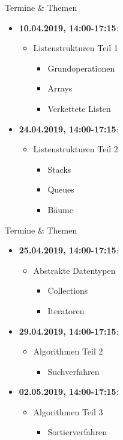\begin{frame}{Termine \& Themen}
	\begin{itemize}
		\item \textbf{10.04.2019, 14:00-17:15}:
		\begin{itemize}
			\item Listenstrukturen Teil 1
			\begin{itemize}
				\item Grundoperationen
				\item Arrays
				\item Verkettete Listen
			\end{itemize}
		\end{itemize}
		\item \textbf{24.04.2019, 14:00-17:15}:
		\begin{itemize}
			\item Listenstrukturen Teil 2
			\begin{itemize}
				\item Stacks
				\item Queues
				\item Bäume
			\end{itemize}
		\end{itemize}
	\end{itemize}
\end{frame}

\begin{frame}{Termine \& Themen}
	\begin{itemize}
		\item \textbf{25.04.2019, 14:00-17:15}:
		\begin{itemize}
			\item Abstrakte Datentypen
			\begin{itemize}
				\item Collections
				\item Iteratoren
			\end{itemize}
		\end{itemize}
		\item \textbf{29.04.2019, 14:00-17:15}:
		\begin{itemize}
			\item Algorithmen Teil 2
			\begin{itemize}
				\item Suchverfahren
			\end{itemize}
		\end{itemize}
		\item \textbf{02.05.2019, 14:00-17:15}:
		\begin{itemize}
			\item Algorithmen Teil 3
			\begin{itemize}
				\item Sortierverfahren
			\end{itemize}
		\end{itemize}
	\end{itemize}
\end{frame}

